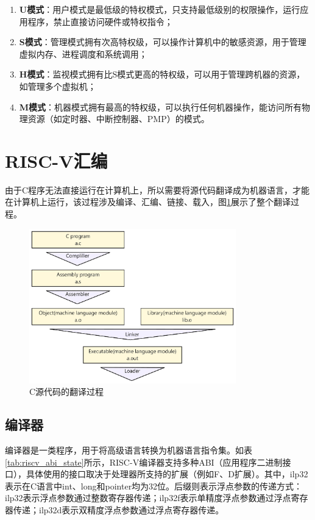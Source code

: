 \begin{enumerate}[label={\arabic*)},itemsep=0pt, parsep=0pt]
	\item \textbf{U模式}：用户模式是最低级的特权模式，只支持最低级别的权限操作，运行应用程序，禁止直接访问硬件或特权指令；
	\item \textbf{S模式}：管理模式拥有次高特权级，可以操作计算机中的敏感资源，用于管理虚拟内存、进程调度和系统调用；
	\item \textbf{H模式}：监视模式拥有比S模式更高的特权级，可以用于管理跨机器的资源，如管理多个虚拟机；
	\item \textbf{M模式}：机器模式拥有最高的特权级，可以执行任何机器操作，能访问所有物理资源（如定时器、中断控制器、PMP）的模式。
\end{enumerate}


\section{RISC-V汇编}
由于C程序无法直接运行在计算机上，所以需要将源代码翻译成为机器语言，才能在计算机上运行，该过程涉及编译、汇编、链接、载入，图\ref{fig:compile}展示了整个翻译过程。

\begin{figure}[htbp]
	\centering
	\includegraphics[width=0.8\textwidth]{image/compile.pdf}
	\caption{C源代码的翻译过程}
	\label{fig:compile}
\end{figure}

\subsection{编译器}
编译器是一类程序，用于将高级语言转换为机器语言指令集。如表\ref{tab:riscv_abi_state}所示，RISC-V编译器支持多种ABI（应用程序二进制接口），具体使用的接口取决于处理器所支持的扩展（例如F、D扩展）。其中，ilp32表示在C语言中int、long和pointer均为32位。后缀则表示浮点参数的传递方式：ilp32表示浮点参数通过整数寄存器传递；ilp32f表示单精度浮点参数通过浮点寄存器传递；ilp32d表示双精度浮点参数通过浮点寄存器传递。

